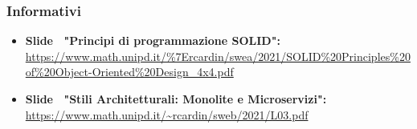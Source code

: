 \subsubsection{Informativi} \label{riferimenti_info}
\begin{itemize}
	\item \textbf{Slide \CR\  "Principi di programmazione SOLID":} \\ 
	\url{
	https://www.math.unipd.it/%
	\item \textbf{Slide \CR\  "Stili Architetturali: Monolite e Microservizi":} \\ 
	\url{https://www.math.unipd.it/~rcardin/sweb/2021/L03.pdf}
\end{itemize}
